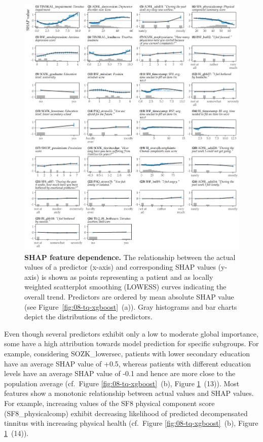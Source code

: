 \documentclass[
  oneside]{book}
\begin{document}
\begin{figure}[htb]

{\centering \includegraphics[width=1\linewidth]{figures/08-tq-xgboost-shap-per-feature} 

}

\caption{\textbf{SHAP feature dependence.} The relationship between the actual values of a predictor (x-axis) and corresponding SHAP values (y-axis) is shown as points representing a patient and as locally weighted scatterplot smoothing (LOWESS) \autocite{Cleveland:LOWESS1981} curves indicating the overall trend. Predictors are ordered by mean absolute SHAP value (see Figure~\ref{fig:08-tq-xgboost}~(a)). Gray histograms and bar charts depict the distributions of the predictors.}\label{fig:08-tq-xgboost-shap-per-feature}
\end{figure}

Even though several predictors exhibit only a low to moderate global importance, some have a high attribution towards model prediction for specific subgroups.
For example, considering SOZK\_lowersec, patients with lower secondary education have an average SHAP value of +0.5, whereas patients with different education levels have an average SHAP value of -0.1 and hence are more close to the population average (cf.~Figure \ref{fig:08-tq-xgboost}~(b), Figure \ref{fig:08-tq-xgboost-shap-per-feature}~(13)).
Most features show a monotonic relationship between actual values and SHAP values.
For example, increasing values of the SF8 physical component score (SF8\_physicalcomp) exhibit decreasing likelihood of predicted decompensated tinnitus with increasing physical health (cf.~Figure \ref{fig:08-tq-xgboost}~(b), Figure \ref{fig:08-tq-xgboost-shap-per-feature}~(14)).
\end{document}
